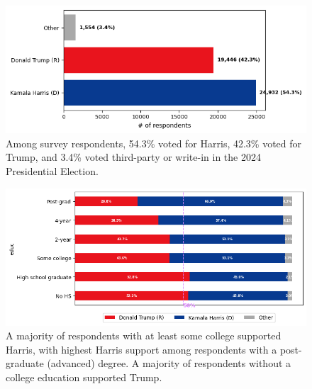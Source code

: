 \documentclass[letter]{article}
\begin{document}
\begin{figure}[H]
    \centering
    \includegraphics[scale=0.65]{eda/ces24-vote_counts.png}
    \caption{Among survey respondents, 54.3\% voted for Harris, 42.3\% voted for Trump, and 3.4\% voted third-party or write-in in the 2024 Presidential Election. }
    \label{fig:ces-vote_counts}
\end{figure} 
\begin{figure}[H]
    \centering
    \includegraphics[scale=0.45]{eda/ces24-educ.png}
    \caption{A majority of respondents with at least some college supported Harris, with highest Harris support among respondents with a post-graduate (advanced) degree. A majority of respondents without a college education supported Trump.}
    \label{fig:ces-educ}
\end{figure} 
\end{document}
